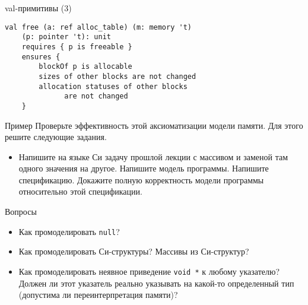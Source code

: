 \documentclass[hyperref={unicode=true}]{beamer}
\begin{document}
    \begin{frame}[fragile]{val-примитивы (3)}
    \begin{lstlisting}
val free (a: ref alloc_table) (m: memory 't)
    (p: pointer 't): unit
    requires { p is freeable }
    ensures {
        blockOf p is allocable
        sizes of other blocks are not changed
        allocation statuses of other blocks
              are not changed
    }
    \end{lstlisting}
    \end{frame}

    \begin{frame}{Пример}
    Проверьте эффективность этой аксиоматизации
    модели памяти. Для этого решите следующие задания.
    \begin{itemize}
    \item Напишите на языке Си задачу прошлой лекции
    с массивом и заменой там одного значения на другое.
    Напишите модель программы. Напишите спецификацию.
    Докажите полную корректность модели программы
    относительно этой спецификации.
    \end{itemize}
    \end{frame}

    \begin{frame}{Вопросы}
    \begin{itemize}
    \item Как промоделировать \texttt{null}?
    \item Как промоделировать Си-структуры? Массивы
    из Си-структур?
    \item Как промоделировать неявное приведение
    \texttt{void *} к любому указателю? Должен ли
    этот указатель реально указывать на какой-то
    определенный тип (допустима ли переинтерпретация
    памяти)?
    \end{itemize}
    \end{frame}
\end{document}
